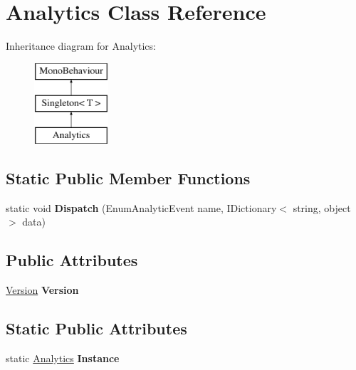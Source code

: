 \hypertarget{class_analytics}{\section{Analytics Class Reference}
\label{class_analytics}
}
Inheritance diagram for Analytics\-:\begin{figure}[H]
\begin{center}
\leavevmode
\includegraphics[height=3.000000cm]{class_analytics}
\end{center}
\end{figure}
\subsection*{Static Public Member Functions}
\begin{DoxyCompactItemize}
\item 
\hypertarget{class_analytics_ad16b4cc8d727e2b08059108f38c2eb28}{static void {\bfseries Dispatch} (Enum\-Analytic\-Event name, I\-Dictionary$<$ string, object $>$ data)}\label{class_analytics_ad16b4cc8d727e2b08059108f38c2eb28}

\end{DoxyCompactItemize}
\subsection*{Public Attributes}
\begin{DoxyCompactItemize}
\item 
\hypertarget{class_analytics_a49a6dec066d22d03fa7457452cbd8429}{\hyperlink{class_version}{Version} {\bfseries Version}}\label{class_analytics_a49a6dec066d22d03fa7457452cbd8429}

\end{DoxyCompactItemize}
\subsection*{Static Public Attributes}
\begin{DoxyCompactItemize}
\item 
\hypertarget{class_analytics_a0df3428b69d7ef489565aa5b0699d09c}{static \hyperlink{class_analytics}{Analytics} {\bfseries Instance}}\label{class_analytics_a0df3428b69d7ef489565aa5b0699d09c}

\end{DoxyCompactItemize}
